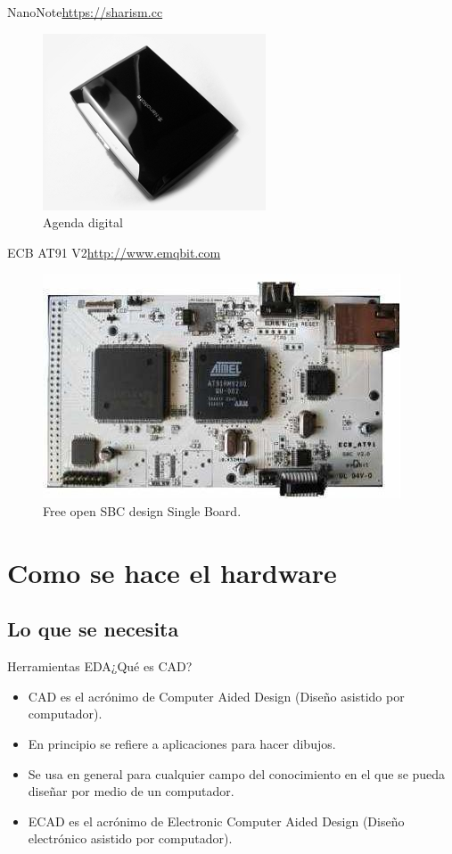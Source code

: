 \documentclass{beamer}
\begin{document}
\begin{frame}{NanoNote}{\url{https://sharism.cc}}
  \begin{figure}
    \centering
    \includegraphics{img/nano}
    \caption{Agenda digital}
    \label{fig:nanonote}
  \end{figure}
\end{frame}

\begin{frame}{ECB AT91 V2}{\url{http://www.emqbit.com}}
  \begin{figure}
    \includegraphics[scale=0.6]{img/V2}
    \caption{Free open SBC design Single Board.}
    \label{fig:ecb}
  \end{figure}
\end{frame}


\section{Como se hace el hardware}

\subsection{Lo que se necesita}

\begin{frame}{Herramientas EDA}{¿Qué es CAD?}
  \begin{itemize}
  \item CAD es el acrónimo de Computer Aided Design (Diseño asistido por computador).
  \item En principio se refiere a aplicaciones para hacer dibujos.
  \item Se usa en general para cualquier campo del conocimiento en el que se pueda diseñar por medio de un computador.
  \item ECAD es el acrónimo de Electronic Computer Aided Design (Diseño electrónico asistido por computador).
  \end{itemize}
\end{frame}
\end{document}
